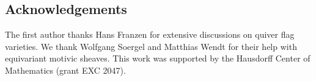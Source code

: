 \documentclass{amsart}
\theoremstyle{plain}
\theoremstyle{TheoremNum}
\theoremstyle{definition}
\theoremstyle{remark}
\numberwithin{equation}{section}
\newcommand{\F}{\mathbb{F}}
\newcommand{\Q}{\mathbb{Q}}
\newcommand{\Cc}{\mathcal{C}}
\newcommand{\Tt}{\mathcal{T}}
\newcommand{\Chow}{\operatorname{CH}}
\begin{document}
\subsection*{Acknowledgements} The first author thanks Hans Franzen for extensive discussions on quiver flag varieties. We thank Wolfgang Soergel and Matthias Wendt for their help with equivariant motivic sheaves.
This work was supported by the Hausdorff Center of Mathematics (grant EXC 2047).

\end{document}
